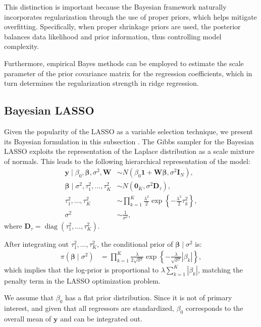 This distinction is important because the Bayesian framework naturally incorporates regularization through the use of proper priors, which helps mitigate overfitting. Specifically, when proper shrinkage priors are used, the posterior balances data likelihood and prior information, thus controlling model complexity.

Furthermore, empirical Bayes methods can be employed to estimate the scale parameter of the prior covariance matrix for the regression coefficients, which in turn determines the regularization strength in ridge regression.

\subsection{Bayesian LASSO}\label{sec13_21}
Given the popularity of the LASSO as a variable selection technique, we present its Bayesian formulation in this subsection \cite{Park2008}. The Gibbs sampler for the Bayesian LASSO exploits the representation of the Laplace distribution as a scale mixture of normals. This leads to the following hierarchical representation of the model:
\begin{align*}
	\mathbf{y} \mid \beta_0, \boldsymbol{\beta}, \sigma^2, \mathbf{W} &\sim {N}(\beta_0 \mathbf{1} + \mathbf{W} \boldsymbol{\beta}, \sigma^2 \mathbf{I}_N), \\
	\boldsymbol{\beta} \mid \sigma^2, \tau_1^2, \dots, \tau_K^2 &\sim {N}(\mathbf{0}_K, \sigma^2 \mathbf{D}_{\tau}), \\
	\tau_1^2, \dots, \tau_K^2 &\sim \prod_{k=1}^K \frac{\lambda^2}{2} \exp\left\{ -\frac{\lambda^2}{2} \tau_k^2 \right\}, \\
	\sigma^2 &\sim \frac{1}{\sigma^2},
\end{align*}
where $	\mathbf{D}_{\tau} = \operatorname{diag}(\tau_1^2, \dots, \tau_K^2)$. 

After integrating out \( \tau_1^2, \dots, \tau_K^2 \), the conditional prior of \( \boldsymbol{\beta} \mid \sigma^2 \) is:
\begin{align*}
	\pi(\boldsymbol{\beta} \mid \sigma^2) &= \prod_{k=1}^K \frac{\lambda}{2 \sqrt{\sigma^2}} \exp\left\{ -\frac{\lambda}{\sqrt{\sigma^2}} |\beta_k| \right\},
\end{align*}
which implies that the log-prior is proportional to \( \lambda \sum_{k=1}^K |\beta_k| \), matching the penalty term in the LASSO optimization problem.

We assume that \( \beta_0 \) has a flat prior distribution. Since it is not of primary interest, and given that all regressors are standardized, \( \beta_0 \) corresponds to the overall mean of \( \mathbf{y} \) and can be integrated out.

